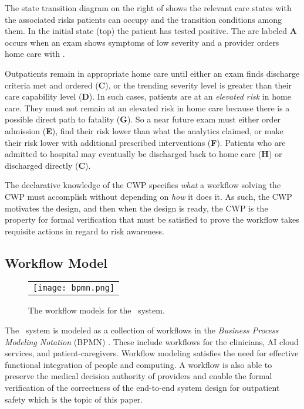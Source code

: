 The state transition diagram on the right of  shows the relevant care states with the associated risks patients can occupy and the transition conditions among them. In the initial state (top) the patient has tested positive. The arc labeled \textbf{A} occurs when an exam shows symptoms of low severity and a provider orders home care with \phware. 

Outpatients remain in appropriate home care until either an exam finds discharge criteria met and ordered (\textbf{C}), or the trending severity level is greater than their care capability level (\textbf{D}). In such cases, patients are at an \emph{elevated risk} in home care. They must not remain at an elevated risk in home care because there is a possible direct path to fatality (\textbf{G}). So a near future exam must either order admission (\textbf{E}), find their risk lower than what the analytics claimed, or make their risk lower with additional prescribed interventions (\textbf{F}). Patients who are admitted to hospital may eventually be discharged back to home care (\textbf{H}) or discharged directly (\textbf{C}). 

The declarative knowledge of the CWP specifies \emph{what} a workflow solving the CWP must accomplish without depending on \emph{how} it does it. As such, the CWP motivates the design, and then when the design is ready, the CWP is the property for formal verification that must be satisfied to prove the workflow takes requisite actions in regard to risk awareness.

\subsection{Workflow Model}
\begin{figure*}
  \begin{center}
    \begin{tabular}{c}
      \texttt{[image: bpmn.png]}
    \end{tabular}
  \end{center}
\caption{The workflow models for the \phware\ system.}
\label{fig:bpmn}
\end{figure*}

The \phware\ system is modeled as a collection of workflows in the \emph{Business Process Modeling Notation} (BPMN) \cite{BPMNSpecification}. These include workflows for the clinicians, AI cloud services, and patient-caregivers. Workflow modeling satisfies the need for effective functional integration of people and computing. A workflow is also able to preserve the medical decision authority of providers and enable the formal verification of the correctness of the end-to-end system design for outpatient safety which is the topic of this paper.


